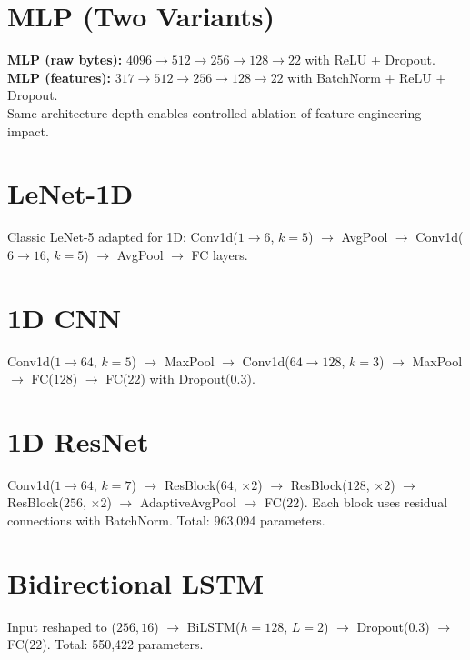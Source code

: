 \documentclass[12pt,a4paper]{report}
\begin{document}
\begin{normalsize}
\section{MLP (Two Variants)}
{\setlength{\baselineskip}{0.95\baselineskip}
\textbf{MLP (raw bytes):} $4096 \rightarrow 512 \rightarrow 256 \rightarrow 128 \rightarrow 22$ with ReLU + Dropout.\\
\textbf{MLP (features):} $317 \rightarrow 512 \rightarrow 256 \rightarrow 128 \rightarrow 22$ with BatchNorm + ReLU + Dropout.\\
Same architecture depth enables controlled ablation of feature engineering impact.
\par}

\section{LeNet-1D}
{\setlength{\baselineskip}{0.95\baselineskip}
Classic LeNet-5 adapted for 1D: Conv1d($1 \rightarrow 6$, $k{=}5$) $\rightarrow$ AvgPool $\rightarrow$ Conv1d($6 \rightarrow 16$, $k{=}5$) $\rightarrow$ AvgPool $\rightarrow$ FC layers.
\par}

\section{1D CNN}
{\setlength{\baselineskip}{0.95\baselineskip}
Conv1d($1 \rightarrow 64$, $k{=}5$) $\rightarrow$ MaxPool $\rightarrow$ Conv1d($64 \rightarrow 128$, $k{=}3$) $\rightarrow$ MaxPool $\rightarrow$ FC($128$) $\rightarrow$ FC($22$) with Dropout(0.3).
\par}

\section{1D ResNet}
{\setlength{\baselineskip}{0.95\baselineskip}
Conv1d($1 \rightarrow 64$, $k{=}7$) $\rightarrow$ ResBlock($64$, $\times 2$) $\rightarrow$ ResBlock($128$, $\times 2$) $\rightarrow$ ResBlock($256$, $\times 2$) $\rightarrow$ AdaptiveAvgPool $\rightarrow$ FC($22$). Each block uses residual connections with BatchNorm. Total: 963,094 parameters.
\par}

\section{Bidirectional LSTM}
{\setlength{\baselineskip}{0.95\baselineskip}
Input reshaped to ($256, 16$) $\rightarrow$ BiLSTM($h{=}128$, $L{=}2$) $\rightarrow$ Dropout(0.3) $\rightarrow$ FC($22$). Total: 550,422 parameters.
\par}


\end{normalsize}
\end{document}

